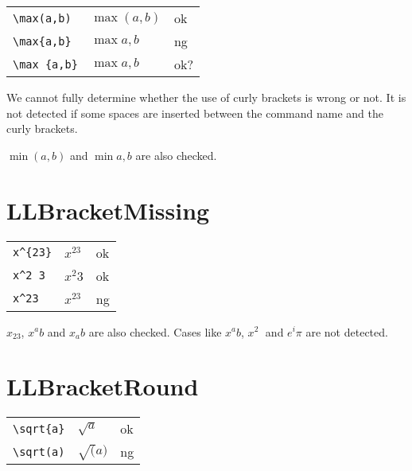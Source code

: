 \documentclass[a4paper]{article}
\newcommand{\tA}[1]{\textcolor{cA}{#1}}
\newcommand{\tC}[1]{\textcolor{cC}{#1}}
\newcommand{\tD}[1]{\textcolor{cD}{#1}}
\begin{document}
\begin{table}[h]
	\centering
	\begin{tabular}{lll}
		\verb|\max(a,b)|  & $\max(a,b)$  & \tA{ok}  \\
		\verb|\max{a,b}|  & $\max{a,b}$  & \tD{ng}  \\
		\verb|\max {a,b}| & $\max {a,b}$ & \tC{ok?}
	\end{tabular}
\end{table}

We cannot fully determine whether the use of curly brackets is wrong or not.
It is not detected if some spaces are inserted between the command name and the curly brackets.

$\min(a,b)$ and $\min{a,b}$ are also checked.

\section{LLBracketMissing}

\begin{table}[H]
	\centering
	\begin{tabular}{lll}
		\verb|x^{23}| & $x^{23}$ & \tA{ok} \\
		\verb|x^2 3|  & $x^2 3$  & \tA{ok} \\
		\verb|x^23|   & $x^23$   & \tD{ng} \\
	\end{tabular}
\end{table}

$x_23$, $x^ab$ and $x_ab$ are also checked.
Cases like $x^a b$, $x^2\;$ and $e^i\pi$ are not detected.


\section{LLBracketRound}

\begin{table}[h]
	\centering
	\begin{tabular}{lll}
		\verb|\sqrt{a}| & $\sqrt{a}$ & \tA{ok} \\
		\verb|\sqrt(a)| & $\sqrt(a)$ & \tD{ng} \\
	\end{tabular}
\end{table}
\end{document}
